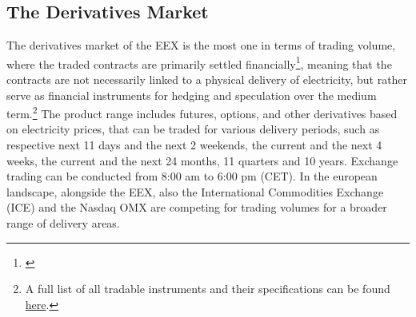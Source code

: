 \documentclass[12pt,a4paper]{cau_thesis}
\begin{document}
\subsection{The Derivatives Market}\label{sub_sec:derivatives_market}
The derivatives market of the EEX is the most one in terms of trading
volume, where the traded contracts are primarily settled
financially\footnote{\cite[See ][, p.
        136]{bnetza_monitoringreport_energy_2025}}, meaning that the
contracts are not necessarily linked to a physical delivery of
electricity, but rather serve as financial instruments for hedging
and speculation over the medium term.\footnote{A full list of all
    tradable instruments and their specifications can be found
    \href{https://www.eex.com/fileadmin/EEX/Downloads/Trading/Specifications/Contract_Details/eex-contract-details-xls-data_20260407.xlsx}{here}.}
The product range includes futures, options, and other derivatives
based on electricity prices, that can be traded for various delivery
periods, such as respective next 11 days and the next 2 weekends, the
current and the next 4 weeks, the current and the next 24 months, 11
quarters and 10 years. Exchange trading can be conducted from 8:00 am
to 6:00 pm (CET). In the european landscape, alongside the EEX, also
the International Commodities Exchange (ICE) and the Nasdaq OMX are
competing for trading volumes for a broader range of delivery areas.
\end{document}
